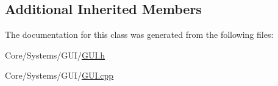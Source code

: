 \subsection*{Additional Inherited Members}


The documentation for this class was generated from the following files\-:\begin{DoxyCompactItemize}
\item 
Core/\-Systems/\-G\-U\-I/\hyperlink{GUI_8h}{G\-U\-I.\-h}\item 
Core/\-Systems/\-G\-U\-I/\hyperlink{GUI_8cpp}{G\-U\-I.\-cpp}\end{DoxyCompactItemize}
